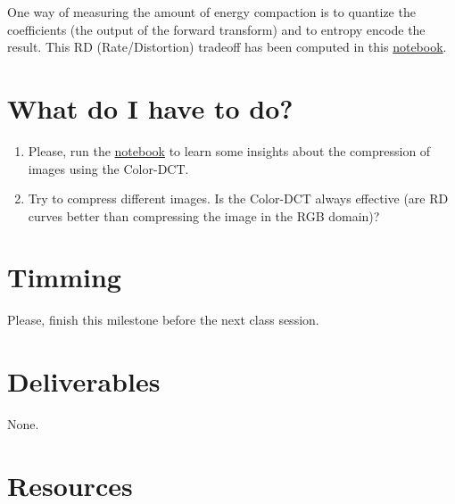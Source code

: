 One way of measuring the amount
of energy compaction is to quantize the coefficients (the output of
the forward transform) and to entropy encode the result. This RD
(Rate/Distortion) tradeoff has been computed in this
\href{https://github.com/Sistemas-Multimedia/Sistemas-Multimedia.github.io/blob/master/contents/color_DCT/RD_performance.ipynb}{notebook}.

\section{What do I have to do?}

\begin{enumerate}
\item Please, run the
  \href{https://github.com/Sistemas-Multimedia/Sistemas-Multimedia.github.io/blob/master/contents/color_DCT/RD_performance.ipynb}{notebook}
  to learn some insights about the compression of images using the Color-DCT.
\item Try to compress different images. Is the Color-DCT always
  effective (are RD curves better than compressing the image in
  the RGB domain)?
\end{enumerate}

\section{Timming}

Please, finish this milestone before the next class session.

\section{Deliverables}

None.

\section{Resources}

\renewcommand{\addcontentsline}[3]{}%


